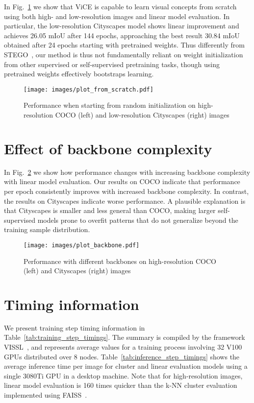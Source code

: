 \documentclass{bmvc2k}
\begin{document}
In Fig.~\ref{fig:from_scratch} we show that ViCE is capable to learn visual concepts from scratch using both high- and low-resolution images and linear model evaluation. In particular, the low-resolution Cityscapes model shows linear improvement and achieves 26.05 mIoU after 144 epochs, approaching the best result 30.84 mIoU obtained after 24 epochs starting with pretrained weights. Thus differently from STEGO~\cite{Hamilton2022STEGO}, our method is thus not fundamentally reliant on weight initialization from other supervised or self-supervised pretraining tasks, though using pretrained weights effectively bootstraps learning.

\begin{figure}
\centering
\texttt{[image: images/plot\_from\_scratch.pdf]}
\caption{Performance when starting from random initialization on high-resolution COCO (left) and low-resolution Cityscapes (right) images}
\label{fig:from_scratch}
\end{figure}

\section{Effect of backbone complexity}

In Fig.~\ref{fig:backbones} we show how performance changes with increasing backbone complexity with linear model evaluation. Our results on COCO indicate that performance per epoch consistently improves with increased backbone complexity. In contrast, the results on Cityscapes indicate worse performance. A plausible explanation is that Cityscapes is smaller and less general than COCO, making larger self-supervised models prone to overfit patterns that do not generalize beyond the training sample distribution.

\begin{figure}
\centering
\texttt{[image: images/plot\_backbone.pdf]}
\caption{Performance with different backbones on high-resolution COCO (left) and Cityscapes (right) images}
\label{fig:backbones}
\end{figure}

\section{Timing information}

We present training step timing information in Table~\ref{tab:training_step_timings}. The summary is compiled by the framework VISSL~\cite{goyal2021vissl}, and represents average values for a training process involving 32 V100 GPUs distributed over 8 nodes. Table~\ref{tab:inference_step_timings} shows the average inference time per image for cluster and linear evaluation models using a single 3080Ti GPU in a desktop machine. Note that for high-resolution images, linear model evaluation is 160 times quicker than the k-NN cluster evaluation implemented using FAISS~\cite{Johnson2019FAISS}.
\end{document}
